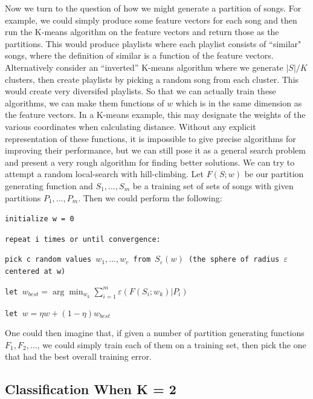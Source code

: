 \documentclass[12pt]{article}
\begin{document}
Now we turn to the question of how we might generate a partition of songs. For example, we could simply produce some feature vectors for each song and then run the K-means algorithm on the feature vectors and return those as the partitions. This would produce playlists where each playlist consists of ``similar" songs, where the definition of similar is a function of the feature vectors. Alternatively consider an ``inverted'' K-means algorithm where we generate $|S| / K$ clusters, then create playlists by picking a random song from each cluster. This would create very diversifed playlists. So that we can actually train these algorithms, we can make them functions of $w$ which is in the same dimension as the feature vectors. In a K-means example, this may designate the weights of the various coordinates when calculating distance. Without any explicit representation of these functions, it is impossible to give precise algorithms for improving their performance, but we can still pose it as a general search problem and present a very rough algorithm for finding better solutions. We can try to attempt a random local-search with hill-climbing. Let $F(S; w)$ be our partition generating function and $S_1, \ldots, S_m$ be a training set of sets of songs with given partitions $P_1, \ldots, P_m$. Then we could perform the following:

\texttt{initialize w = 0}

\texttt{repeat i times or until convergence:}

\texttt{\qquad pick c random values $w_1, \ldots, w_c$ from $S_\varepsilon(w)$ (the sphere of radius $\varepsilon$ centered at w)}

\texttt{\qquad let $w_{best} = \arg \min_{w_k} \sum_{i=1}^m \varepsilon(F(S_i; w_k) | P_i)$}

\texttt{\qquad let $w = \eta w + (1 - \eta) w_{best}$ }

One could then imagine that, if given a number of partition generating functions $F_1, F_2, \ldots$, we could simply train each of them on a training set, then pick the one that had the best overall training error.

\subsection*{Classification When K = 2}
\end{document}

